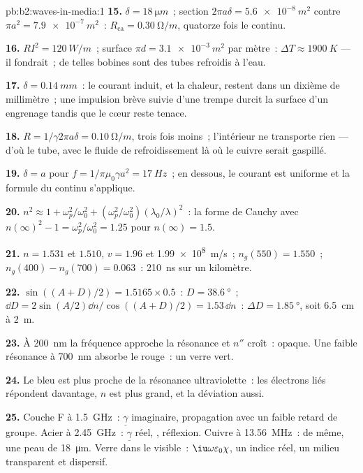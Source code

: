 \begin{solution}{pb:b2:waves-in-media:1}
\textbf{15.} $\delta = \qty{18}{\micro m}$~; section $2\pi a\delta = \qty{5.6e-8}{m^2}$ contre
$\pi a^2 = \qty{7.9e-7}{m^2}$~: $R_{\text{ca}} = \qty{0.30}{\ohm/m}$, quatorze fois le continu.

\textbf{16.} $RI^2 = \qty{120}{W/m}$~; surface $\pi d = \qty{3.1e-3}{m^2}$ par mètre~:
$\Delta T \approx \qty{1900}{K}$ --- il fondrait~; de telles bobines sont des tubes refroidis à l'eau.

\textbf{17.} $\delta = \qty{0.14}{mm}$~: le courant induit, et la chaleur, restent
dans un dixième de millimètre~; une impulsion brève suivie d'une trempe durcit
la surface d'un engrenage tandis que le cœur reste tenace.

\textbf{18.} $R = 1/\gamma2\pi a\delta = \qty{0.10}{\ohm/m}$, trois fois moins~; l'intérieur
ne transporte rien --- d'où le tube, avec le fluide de refroidissement là où le
cuivre serait gaspillé.

\textbf{19.} $\delta = a$ pour $f = 1/\pi\mu_0\gamma a^2 = \qty{17}{Hz}$~; en dessous, le courant est
uniforme et la formule du continu s'applique.

\textbf{20.} $n^2 \approx 1 + \omega_p^2/\omega_0^2 + (\omega_p^2/\omega_0^2)(\lambda_0/\lambda)^2$~: la forme de Cauchy
avec $n(\infty)^2 - 1 = \omega_p^2/\omega_0^2 = 1.25$ pour $n(\infty) = 1.5$.

\textbf{21.} $n = 1.531$ et $1.510$, $v = 1.96$ et \qty{1.99e8}{m/s}~; $n_g(550) =
1.550$~; $n_g(400) - n_g(700) = 0.063$~: \qty{210}{ns} sur un kilomètre.

\textbf{22.} $\sin((A + D)/2) = 1.5165 \times 0.5$~: $D = \qty{38.6}{\degree}$~; $\dd D = 2\sin
(A/2)\dd n/\cos((A + D)/2) = 1.53\,\dd n$~: $\Delta D = \qty{1.85}{\degree}$, soit \qty{6.5}{cm} à \qty{2}{m}.

\textbf{23.} À \qty{200}{nm} la fréquence approche la résonance et
$n''$ croît~: opaque. Une faible résonance à \qty{700}{nm} absorbe le rouge~:
un verre vert.

\textbf{24.} Le bleu est plus proche de la résonance ultraviolette~: les électrons
liés répondent davantage, $n$ est plus grand, et la déviation aussi.

\textbf{25.} Couche F à \qty{1.5}{GHz}~: $\underline\gamma$ imaginaire, propagation
avec un faible retard de groupe. Acier à \qty{2.45}{GHz}~: $\underline\gamma$ réel, , réflexion. Cuivre à \qty{13.56}{MHz}~: de même, une peau de
\qty{18}{\micro m}. Verre dans le visible~: $\iu\omega\varepsilon_0\chi$, un indice réel, un
milieu transparent et dispersif.
\end{solution}
